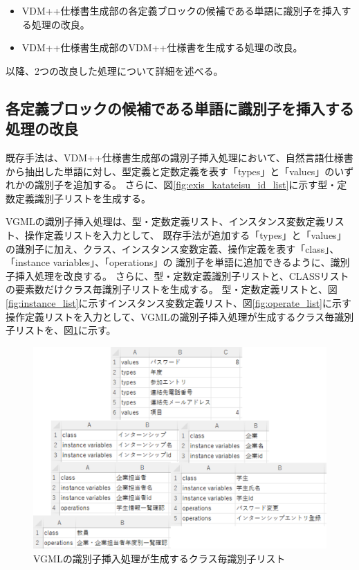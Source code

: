 \begin{itemize}
    \item VDM++仕様書生成部の各定義ブロックの候補である単語に識別子を挿入する処理の改良。
    \item VDM++仕様書生成部のVDM++仕様書を生成する処理の改良。
\end{itemize}

以降、2つの改良した処理について詳細を述べる。

\subsection{各定義ブロックの候補である単語に識別子を挿入する処理の改良}
既存手法は、VDM++仕様書生成部の識別子挿入処理において、自然言語仕様書から抽出した単語に対し、型定義と定数定義を表す「types」と「values」のいずれかの識別子を追加する。
さらに、図\ref{fig:exis_katateisu_id_list}に示す型・定数定義識別子リストを生成する。

VGMLの識別子挿入処理は、型・定数定義リスト、インスタンス変数定義リスト、操作定義リストを入力として、
既存手法が追加する「types」と「values」の識別子に加え、クラス、インスタンス変数定義、操作定義を表す「class」、「instance variables」、「operations」の
識別子を単語に追加できるように、識別子挿入処理を改良する。
さらに、型・定数定義識別子リストと、CLASSリストの要素数だけクラス毎識別子リストを生成する。
型・定数定義リストと、図\ref{fig:instance_list}に示すインスタンス変数定義リスト、図\ref{fig:operate_list}に示す操作定義リストを入力として、VGMLの識別子挿入処理が生成するクラス毎識別子リストを、図\ref{fig:vgml_sikibetushi_list}に示す。

\begin{figure}[t]
    \begin{center}
        \includegraphics[width=1.0\columnwidth]{image/vgml_sikibetushi_list.png}
        \caption{VGMLの識別子挿入処理が生成するクラス毎識別子リスト}
        \label{fig:vgml_sikibetushi_list}
    \end{center}
\end{figure}

